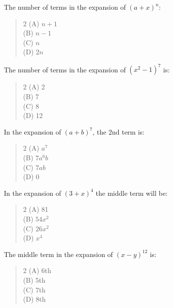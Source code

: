\documentclass[11pt,a4paper]{article}
\begin{document}
\begin{mcqlist}
\item The number of terms in the expansion of $(a+x)^n$:
\begin{quote}\begin{multicols}{2}
\noindent (A) $n+1$ \\
(B) $n-1$ \\
(C) $n$ \\
(D) $2n$
\end{multicols}\end{quote}

\item The number of terms in the expansion of $(x^2-1)^7$ is:
\begin{quote}\begin{multicols}{2}
\noindent (A) 2 \\
(B) 7 \\
(C) 8 \\
(D) 12
\end{multicols}\end{quote}

\item In the expansion of $(a+b)^7$, the 2nd term is:
\begin{quote}\begin{multicols}{2}
\noindent (A) $a^7$ \\
(B) $7a^6b$ \\
(C) $7ab$ \\
(D) 0
\end{multicols}\end{quote}

\item In the expansion of $(3+x)^4$ the middle term will be:
\begin{quote}\begin{multicols}{2}
\noindent (A) 81 \\
(B) $54x^2$ \\
(C) $26x^2$ \\
(D) $x^4$
\end{multicols}\end{quote}

\item The middle term in the expansion of $(x-y)^{12}$ is:
\begin{quote}\begin{multicols}{2}
\noindent (A) 6th \\
(B) 5th \\
(C) 7th \\
(D) 8th
\end{multicols}\end{quote}


\end{mcqlist}
\end{document}
